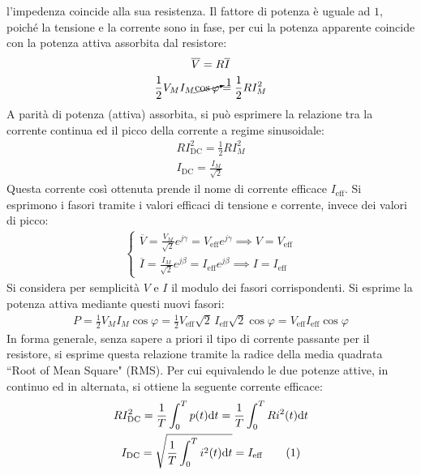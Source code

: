 \documentclass{article}
\newcommand{\df}{\mathrm{d}}
\newcommand{\tageq}{\tag{\stepcounter{equation}\theequation}}
\numberwithin{equation}{subsection}
\begin{document}
l'impedenza coincide alla sua resistenza. Il fattore di potenza è uguale ad $1$, poiché la tensione e la corrente sono in fase, per cui la potenza apparente coincide con la 
potenza attiva assorbita dal resistore:
\begin{gather*}
    \overline{V}=R\overline{I}\\
    \displaystyle\frac{1}{2}V_MI_M\cancelto{1}{\cos\varphi}=\frac{1}{2}RI_M^2
\end{gather*}
A parità di potenza (attiva) assorbita, si può esprimere la relazione tra la corrente continua ed il picco della corrente a regime sinusoidale:
\begin{gather*}
    RI_{\mathrm{DC}}^2=\displaystyle\frac{1}{2}RI_M^2\\
    I_{\mathrm{DC}}=\displaystyle\frac{I_M}{\sqrt{2}}
\end{gather*}
Questa corrente così ottenuta prende il nome di corrente efficace $I_{\mathrm{eff}}$. 
Si esprimono i fasori tramite i valori efficaci di tensione e corrente, invece dei valori di picco:
\begin{gather}
    \begin{cases}
        \overline{V}=\displaystyle\frac{V_{M}}{\sqrt{2}}e^{j\gamma}=V_{\mathrm{eff}}e^{j\gamma}\implies V=V_{\mathrm{eff}}\\
        \overline{I}=\displaystyle\frac{I_{M}}{\sqrt{2}}e^{j\beta}=I_{\mathrm{eff}}e^{j\beta}\implies I=I_{\mathrm{eff}}
    \end{cases}
\end{gather}
Si considera per semplicità $V$ e $I$ il modulo dei fasori corrispondenti. 
Si esprime la potenza attiva mediante questi nuovi fasori: 
\begin{gather}
    P=\displaystyle\frac{1}{2}V_MI_M\cos\varphi=\frac{1}{2}V_{\mathrm{eff}}\sqrt{2}\,I_{\mathrm{eff}}\sqrt{2}\cos\varphi=V_{\mathrm{eff}}I_{\mathrm{eff}}\cos\varphi
\end{gather}
In forma generale, senza sapere a priori il tipo di corrente passante per il resistore, si esprime questa relazione tramite la radice 
della media quadrata ``Root of Mean Square" (RMS). Per cui equivalendo le due potenze attive, in continuo ed in alternata, si ottiene la seguente corrente efficace: 
\begin{gather*}
    RI_{\mathrm{DC}}^2=\displaystyle\frac{1}{T}\int_0^Tp(t)\df t=\frac{1}{T}\int_0^TRi^2(t)\df t\\
    I_{\mathrm{DC}}=\displaystyle\sqrt{\frac{1}{T}\int_0^Ti^2(t)\df t}=I_{\mathrm{eff}}\tageq
\end{gather*}
\end{document}
